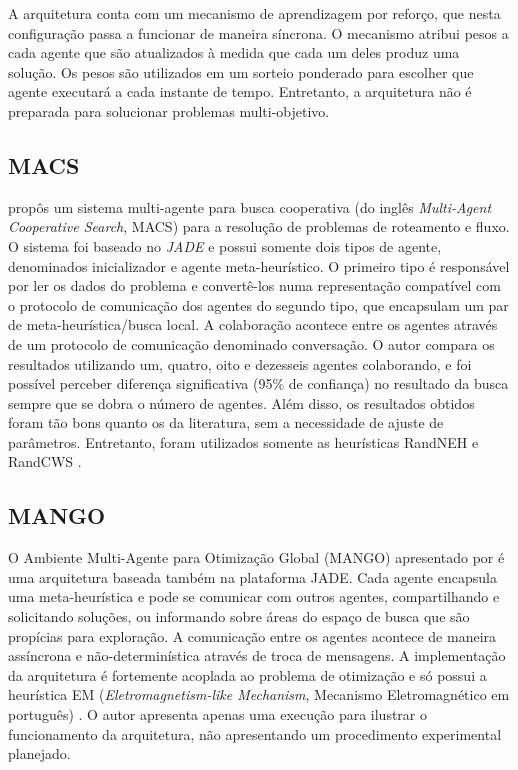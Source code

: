A arquitetura conta com um mecanismo de aprendizagem por reforço, que nesta configuração passa a funcionar de maneira síncrona. O mecanismo atribui pesos a cada agente que são atualizados à medida que cada um deles produz uma solução. Os pesos são utilizados em um sorteio ponderado para escolher que agente executará a cada instante de tempo. Entretanto, a arquitetura não é preparada para solucionar problemas multi-objetivo. 

\subsection{MACS}
 propôs um sistema multi-agente para busca cooperativa (do inglês \textit{Multi-Agent Cooperative Search}, MACS) para a resolução de problemas de roteamento e fluxo. O sistema foi baseado no \textit{JADE} e possui somente dois tipos de agente, denominados inicializador e agente meta-heurístico. O primeiro tipo é responsável por ler os dados do problema e convertê-los numa representação compatível com o protocolo de comunicação dos agentes  do segundo tipo, que encapsulam um par de meta-heurística/busca local. A colaboração acontece entre os agentes através de um protocolo de comunicação denominado conversação. O autor compara os resultados utilizando um, quatro, oito e dezesseis agentes colaborando, e foi possível perceber diferença significativa (95\% de confiança) no resultado da busca sempre que se dobra o número de agentes. Além disso, os resultados obtidos foram tão bons quanto os da literatura, sem a necessidade de ajuste de parâmetros. Entretanto, foram utilizados somente as heurísticas RandNEH \cite{juan2010b} e RandCWS \cite{juan2010a}.

\subsection{MANGO}
O Ambiente Multi-Agente para Otimização Global (MANGO) apresentado por  é uma arquitetura baseada também na plataforma JADE. Cada agente encapsula uma meta-heurística e pode se comunicar com outros agentes, compartilhando e solicitando soluções, ou informando sobre áreas do espaço de busca que são propícias para exploração. A comunicação entre os agentes acontece de maneira assíncrona e não-determinística através de troca de mensagens. A implementação da arquitetura é fortemente acoplada ao problema de otimização e só possui a heurística EM (\textit{Eletromagnetism-like Mechanism}, Mecanismo Eletromagnético em português) \cite{birbil2003}. O autor apresenta apenas uma execução para ilustrar o funcionamento da arquitetura, não apresentando um procedimento experimental planejado.


